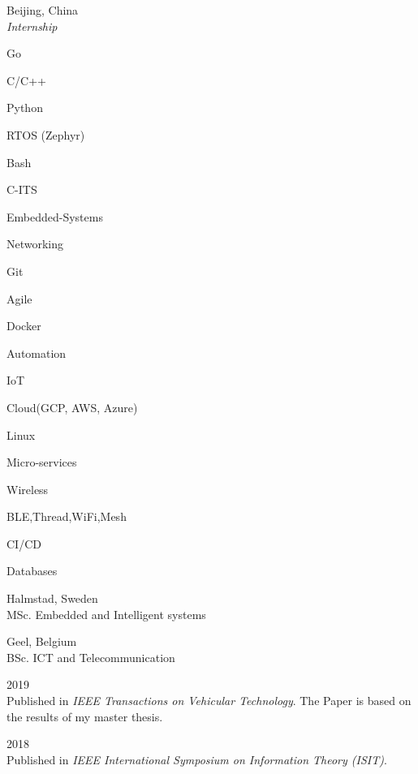 \documentclass[a4paper,12pt,final]{memoir}
\begin{document}
 \hfill Beijing, China \\
\emph{Internship}
\Sep


	
\begin{multicols}{3}
\begin{compactitem}[\color{RoyalBlue}$\circ$]
	\item Go
	\item C/C++ 
	\item Python
	\item RTOS (Zephyr) 
	\item Bash
	\item C-ITS
	\item Embedded-Systems
	\item Networking
	\item Git
	\item Agile 
	\item Docker
	\item Automation
	\item IoT
	\item Cloud(GCP, AWS, Azure)
	\item Linux
	\item Micro-services
	\item Wireless
	\item BLE,Thread,WiFi,Mesh
	\item CI/CD
	\item Databases
\end{compactitem}
\end{multicols}

\Sep

 \hfill Halmstad, Sweden \\
MSc. Embedded and Intelligent systems
\SmallSep

 \hfill Geel, Belgium \\
BSc. ICT and Telecommunication
\Sep

 \hfill 2019 \\
Published in \emph{IEEE Transactions on Vehicular Technology}. The Paper is based on the results of my master thesis.
\SmallSep

 \hfill 2018 \\
Published in \emph{IEEE International Symposium on Information Theory (ISIT)}.
\Sep

\end{document}
